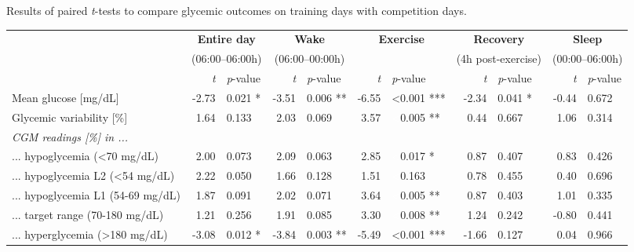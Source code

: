 \documentclass[11pt,a4paper]{article}
\newcommand{\nl}[0]{\textcolor{white}{<}}
\begin{document}
\hspace*{-1.2cm}
\begin{threeparttable}
    \caption[Statistical comparison of glycemic outcomes on training days with competition days]{Results of paired \textit{t}-tests to compare glycemic outcomes on training days with competition days.}
    \label{tab:ttest-rel}
    \scriptsize
    \centering
    \begin{tabular}{@{}l rl rl rl rl rl@{}}
        \toprule
        & \multicolumn{2}{c}{\textbf{Entire day}} & \multicolumn{2}{c}{\textbf{Wake}} & \multicolumn{2}{c}{\textbf{Exercise}} & \multicolumn{2}{c}{\textbf{Recovery}} & \multicolumn{2}{c}{\textbf{Sleep}}\\
        & \multicolumn{2}{c}{(06:00--06:00h)} & \multicolumn{2}{c}{(06:00--00:00h)} & & & \multicolumn{2}{c}{(4h post-exercise)} & \multicolumn{2}{c}{(00:00--06:00h)}\\
        & \textit{t} & \textit{p}-value & \textit{t} & \textit{p}-value & \textit{t} & \textit{p}-value & \textit{t} & \textit{p}-value & \textit{t} & \textit{p}-value \\ 
        \midrule
        Mean glucose [mg/dL]                              & -2.73 &  0.021 * & -3.51 &  0.006 ** & -6.55 &   <0.001 *** & -2.34 &  0.041 * & -0.44 &  0.672 \\
        Glycemic variability [\%]                         &  1.64 &  0.133   &  2.03 &  0.069    &  3.57 & \nl0.005 **  &  0.44 &  0.667   &  1.06 &  0.314 \\
        \textit{CGM readings [\%] in ...} \\
        ... hypoglycemia (<70 mg/dL)                      &  2.00 &  0.073   &  2.09 &  0.063    & 2.85  & \nl0.017 *   &  0.87 &  0.407   &  0.83 &  0.426 \\
        \hspace{3mm} ... hypoglycemia L2 (<54 mg/dL)      &  2.22 &  0.050   &  1.66 &  0.128    &  1.51 & \nl0.163     &  0.78 &  0.455   &  0.40 &  0.696 \\
        \hspace{3mm} ... hypoglycemia L1 (54-69 mg/dL)    &  1.87 &  0.091   &  2.02 &  0.071    &  3.64 & \nl0.005 **  &  0.87 &  0.403   &  1.01 &  0.335 \\
        ... target range (70-180 mg/dL)                   &  1.21 &  0.256   &  1.91 &  0.085    &  3.30 & \nl0.008 **  &  1.24 &  0.242   & -0.80 &  0.441 \\
        ... hyperglycemia (>180 mg/dL)                    & -3.08 &  0.012 * & -3.84 &  0.003 ** & -5.49 &   <0.001 *** & -1.66 &  0.127   &  0.04 &  0.966 \\

\end{tabular}
\end{threeparttable}
\end{document}
